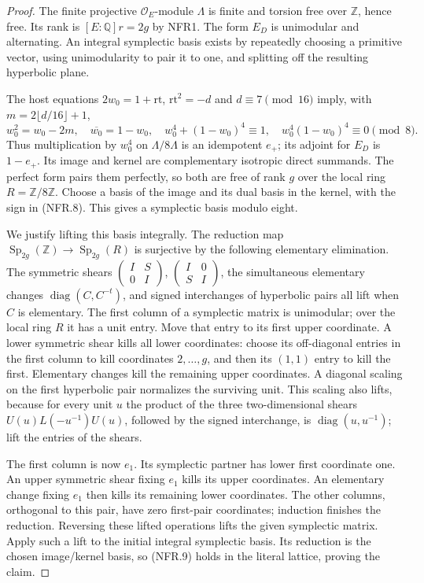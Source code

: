 \begin{proof}
The finite projective $\mathcal O_E$-module $\Lambda$ is finite
and torsion free over $\mathbb Z$, hence free.  Its rank is
$[E:\mathbb Q]r=2g$ by NFR1.  The form $E_D$ is unimodular
and alternating.  An integral symplectic basis exists by repeatedly
choosing a primitive vector, using unimodularity to pair it to one,
and splitting off the resulting hyperbolic plane.

The host equations $2w_0=1+\mathrm{rt}$,
$\mathrm{rt}^2=-d$ and $d\equiv7\pmod {16}$ imply, with
$m=2\lfloor d/16\rfloor+1$,
\[
 w_0^2=w_0-2m,\quad \overline{w_0}=1-w_0,\quad
 w_0^4+(1-w_0)^4\equiv1,\quad
 w_0^4(1-w_0)^4\equiv0\pmod8.
 \tag{NFR.10}
\]
Thus multiplication by $w_0^4$ on $\Lambda/8\Lambda$ is an
idempotent $e_+$; its adjoint for $E_D$ is $1-e_+$.
Its image and kernel are complementary isotropic direct summands.
The perfect form pairs them perfectly, so both are free of rank
$g$ over the local ring $R=\mathbb Z/8\mathbb Z$.
Choose a basis of the image and its dual basis in the kernel,
with the sign in (NFR.8).  This gives a symplectic basis modulo eight.

We justify lifting this basis integrally.  The reduction map
$\operatorname{Sp}_{2g}(\mathbb Z)\to\operatorname{Sp}_{2g}(R)$
is surjective by the following elementary elimination.
The symmetric shears
$\left(\begin{smallmatrix}I&S\\0&I\end{smallmatrix}\right)$,
$\left(\begin{smallmatrix}I&0\\S&I\end{smallmatrix}\right)$,
the simultaneous elementary changes
$\operatorname{diag}(C,C^{-t})$, and signed interchanges of
hyperbolic pairs all lift when $C$ is elementary.
The first column of a symplectic matrix is unimodular; over the
local ring $R$ it has a unit entry.  Move that entry to its first
upper coordinate.  A lower symmetric shear kills all lower
coordinates: choose its off-diagonal entries in the first column
to kill coordinates $2,\ldots,g$, and then its $(1,1)$ entry
to kill the first.  Elementary changes kill the remaining upper
coordinates.  A diagonal scaling on the first hyperbolic pair
normalizes the surviving unit.  This scaling also lifts, because
for every unit $u$ the product of the three two-dimensional shears
$U(u)L(-u^{-1})U(u)$, followed by the signed interchange, is
$\operatorname{diag}(u,u^{-1})$; lift the entries of the shears.

The first column is now $e_1$.  Its symplectic partner has lower
first coordinate one.  An upper symmetric shear fixing $e_1$
kills its upper coordinates.  An elementary change fixing $e_1$
then kills its remaining lower coordinates.  The other columns,
orthogonal to this pair, have zero first-pair coordinates; induction
finishes the reduction.  Reversing these lifted operations lifts
the given symplectic matrix.  Apply such a lift to the initial
integral symplectic basis.  Its reduction is the chosen image/kernel
basis, so (NFR.9) holds in the literal lattice, proving the claim.
\end{proof}

